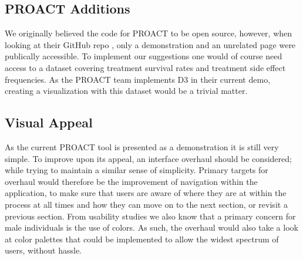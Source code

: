 \documentclass[journal]{vgtc}                %
\begin{document}
        \subsection{PROACT Additions}
                We originally believed the code for PROACT to be open source, however, when looking at their GitHub repo \cite{PROACTDemo:2016}, only a demonstration and an unrelated page were publically accessible.
                To implement our suggestions one would of course need access to a dataset covering treatment survival rates and treatment side effect frequencies.
                As the PROACT team implements D3 in their current demo, creating a visualization with this dataset would be a trivial matter.

        \subsection{Visual Appeal}
                As the current PROACT tool is presented as a demonstration it is still very simple.
                To improve upon its appeal, an interface overhaul should be considered; while trying to maintain a similar sense of simplicity.
                Primary targets for overhaul would therefore be the improvement of navigation within the application, to make sure that users are aware of where they are at within the process at all times and how they can move on to the next section, or revisit a previous section.
                From usability studies we also know that a primary concern for male individuals is the use of colors.
                As such, the overhaul would also take a look at color palettes that could be implemented to allow the widest spectrum of users, without hassle.



%

%
%
%


\end{document}

